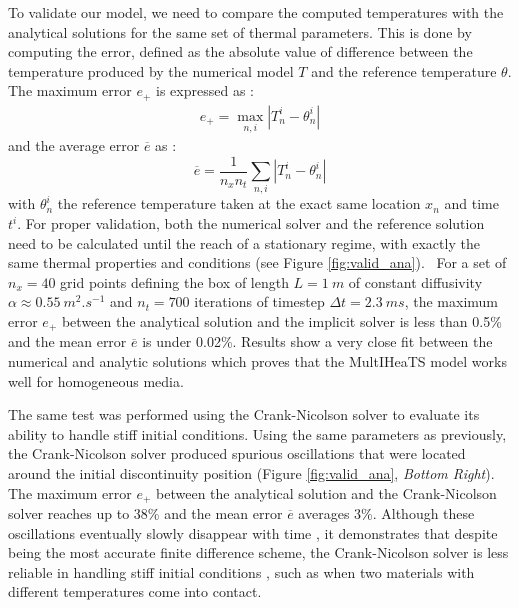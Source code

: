 \documentclass[sn-vancouver, Numbered]{sn-jnl}
\begin{document}
To validate our model, we need to compare the computed temperatures with the analytical solutions for the same set of thermal parameters. This is done by computing the error, defined as the absolute value of difference between the temperature produced by the numerical model $T$ and the reference temperature $\theta$. The maximum error $e_+$ is expressed as : 
\begin{align}
    e_+ = \max_{n, i} \left| T^i_n - \theta^i_n \right|
\end{align}
and the average error $\overline{e}$ as :
\begin{equation}
    \overline{e} = \frac{1}{n_x n_t} \sum_{n, i}\left| T^i_n - \theta^i_n \right|
\end{equation}
with $\theta^i_n$ the reference temperature taken at the exact same location $x_n$ and time $t^i$.
For proper validation, both the numerical solver and the reference solution need to be calculated until the reach of a stationary regime, with exactly the same thermal properties and conditions (see Figure \ref{fig:valid_ana}). \
For a set of $n_x= 40$ grid points defining the box of length $L=\SI{1}{m}$ of constant diffusivity $\alpha \approx \SI{0.55}{m^2.s^{-1}}$ and $n_t=700$ iterations of timestep $\Delta t = \SI{2.3}{ms}$, the maximum error $e_+$ between the analytical solution and the implicit solver is less than 0.5\% and the mean error $\overline{e}$ is under 0.02\%.  
Results show a very close fit between the numerical and analytic solutions which proves that the MultIHeaTS model works well for homogeneous media.


The same test was performed using the Crank-Nicolson solver \cite{Schorghofer2010} to evaluate its ability to handle stiff initial conditions.
Using the same parameters as previously, the Crank-Nicolson solver produced spurious oscillations that were located around the initial discontinuity position (Figure \ref{fig:valid_ana}, \textit{Bottom Right}). 
The maximum error $e_+$ between the analytical solution and the Crank-Nicolson solver reaches up to 38\% and the mean error $\overline{e}$ averages 3\%. 
Although these oscillations eventually slowly disappear with time \cite{Oesterby2003}, it demonstrates that despite being the most accurate finite difference scheme, the Crank-Nicolson solver is less reliable in handling stiff initial conditions \cite{Press1992, Oesterby2003, Langtangen2017}, such as when two materials with different temperatures come into contact.


\end{document}
